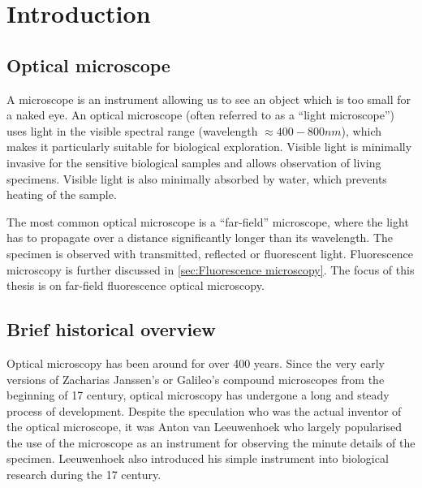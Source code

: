 \chapter{Introduction\label{ch:Introduction}}


\section{Optical microscope} %

A microscope is an instrument allowing us to see an object which is too small for a naked eye. An optical microscope (often referred to as a ``light microscope'') uses light in the visible spectral range (wavelength $\approx400-800\unit{nm}$), which makes it particularly suitable for biological exploration. Visible light is minimally invasive for the sensitive biological samples and allows observation of living specimens. Visible light is also minimally absorbed by water, which prevents heating of the sample.

 The most common optical microscope is a ``far-field'' microscope, where the light has to propagate over a distance significantly longer than its wavelength. The specimen is observed with transmitted, reflected or fluorescent light. Fluorescence microscopy is further discussed in \autoref{sec:Fluorescence microscopy}. The focus of this thesis is on far-field fluorescence optical microscopy.


\section{Brief historical overview}

Optical microscopy has been around for over 400 years. Since the very early versions of Zacharias Janssen's or Galileo's compound microscopes from the beginning of 17\ths{} century, optical microscopy has undergone a long and steady process of development. Despite the speculation who was the actual inventor of the optical microscope, it was Anton van Leeuwenhoek who largely popularised the use of the microscope as an instrument for observing the minute details of the specimen. Leeuwenhoek also introduced his simple instrument into biological research during the 17\ths{} century.

